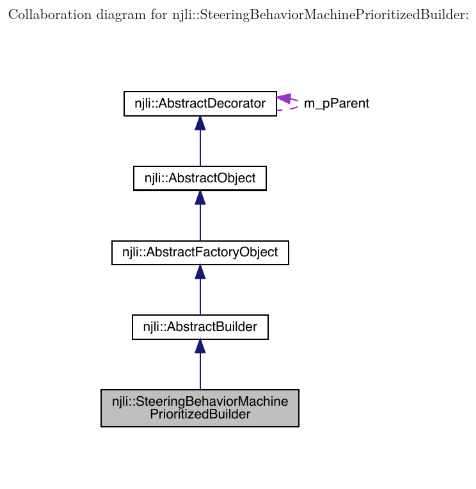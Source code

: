 Collaboration diagram for njli\+:\+:Steering\+Behavior\+Machine\+Prioritized\+Builder\+:\nopagebreak
\begin{figure}[H]
\begin{center}
\leavevmode
\includegraphics[width=281pt]{classnjli_1_1_steering_behavior_machine_prioritized_builder__coll__graph}
\end{center}
\end{figure}
